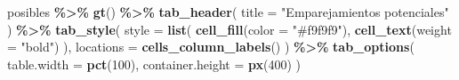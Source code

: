 \documentclass[
  12pt,
]{book}
\newenvironment{Shaded}{\begin{snugshade}}{\end{snugshade}}
\newcommand{\AttributeTok}[1]{\textcolor[rgb]{0.13,0.29,0.53}{#1}}
\newcommand{\DecValTok}[1]{\textcolor[rgb]{0.00,0.00,0.81}{#1}}
\newcommand{\FunctionTok}[1]{\textcolor[rgb]{0.13,0.29,0.53}{\textbf{#1}}}
\newcommand{\NormalTok}[1]{#1}
\newcommand{\SpecialCharTok}[1]{\textcolor[rgb]{0.81,0.36,0.00}{\textbf{#1}}}
\newcommand{\StringTok}[1]{\textcolor[rgb]{0.31,0.60,0.02}{#1}}
\begin{document}
\begin{Shaded}
\begin{Highlighting}[]
\NormalTok{posibles }\SpecialCharTok{\%\textgreater{}\%}
  \FunctionTok{gt}\NormalTok{() }\SpecialCharTok{\%\textgreater{}\%}
  \FunctionTok{tab\_header}\NormalTok{(}
    \AttributeTok{title =} \StringTok{"Emparejamientos potenciales"}
\NormalTok{  ) }\SpecialCharTok{\%\textgreater{}\%}
  \FunctionTok{tab\_style}\NormalTok{(}
    \AttributeTok{style =} \FunctionTok{list}\NormalTok{(}
      \FunctionTok{cell\_fill}\NormalTok{(}\AttributeTok{color =} \StringTok{"\#f9f9f9"}\NormalTok{),}
      \FunctionTok{cell\_text}\NormalTok{(}\AttributeTok{weight =} \StringTok{"bold"}\NormalTok{)}
\NormalTok{    ),}
    \AttributeTok{locations =} \FunctionTok{cells\_column\_labels}\NormalTok{()}
\NormalTok{  ) }\SpecialCharTok{\%\textgreater{}\%}
  \FunctionTok{tab\_options}\NormalTok{(}
    \AttributeTok{table.width =} \FunctionTok{pct}\NormalTok{(}\DecValTok{100}\NormalTok{),}
    \AttributeTok{container.height =} \FunctionTok{px}\NormalTok{(}\DecValTok{400}\NormalTok{) }
\NormalTok{  )}
\end{Highlighting}
\end{Shaded}
\end{document}
